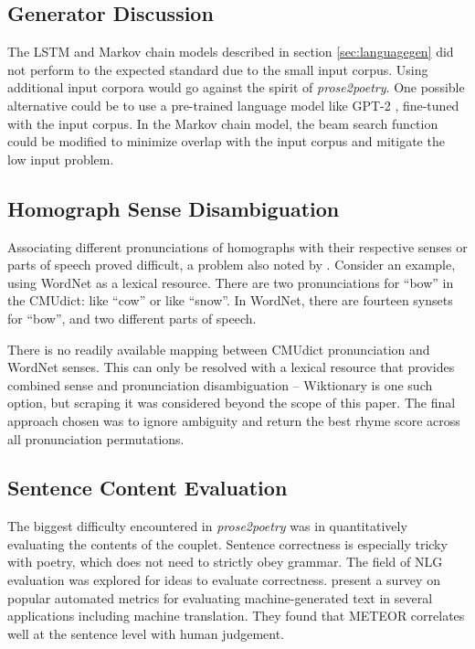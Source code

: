 \documentclass[11pt,a4paper]{article}
\begin{document}
\subsection{Generator Discussion}
\label{sec:discconcgen}

The LSTM and Markov chain models described in section \ref{sec:languagegen} did not perform to the expected standard due to the small input corpus. Using additional input corpora would go against the spirit of \textit{prose2poetry}. One possible alternative could be to use a pre-trained language model like GPT-2 \cite{gpt2}, fine-tuned with the input corpus. In the Markov chain model, the beam search function could be modified to minimize overlap with the input corpus and mitigate the low input problem.

\subsection{Homograph Sense Disambiguation}
\label{sec:synset}

Associating different pronunciations of homographs with their respective senses or parts of speech proved difficult, a problem also noted by \citet{hopkins-kiela-2017}. Consider an example, using WordNet \cite{wordnet} as a lexical resource. There are two pronunciations for ``bow'' in the CMUdict: like ``cow'' or like ``snow''. In WordNet, there are fourteen synsets for ``bow'', and two different parts of speech.

There is no readily available mapping between CMUdict pronunciation and WordNet senses. This can only be resolved with a lexical resource that provides combined sense and pronunciation disambiguation -- Wiktionary \cite{wiktionary} is one such option, but scraping it was considered beyond the scope of this paper. The final approach chosen was to ignore ambiguity and return the best rhyme score across all pronunciation permutations.

\subsection{Sentence Content Evaluation}
\label{sec:nlg}

The biggest difficulty encountered in \textit{prose2poetry} was in quantitatively evaluating the contents of the couplet. Sentence correctness is especially tricky with poetry, which does not need to strictly obey grammar. The field of NLG evaluation was explored for ideas to evaluate correctness. \citet{nlgeval} present a survey on popular automated metrics for evaluating machine-generated text in several applications including machine translation. They found that METEOR \cite{meteor} correlates well at the sentence level with human judgement.
\end{document}
